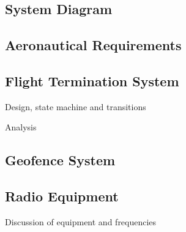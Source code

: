 \subsection{System Diagram}

\subsection{Aeronautical Requirements}

\subsection{Flight Termination System}
Design, state machine and transitions

Analysis

\subsection{Geofence System}

\subsection{Radio Equipment}
Discussion of equipment and frequencies